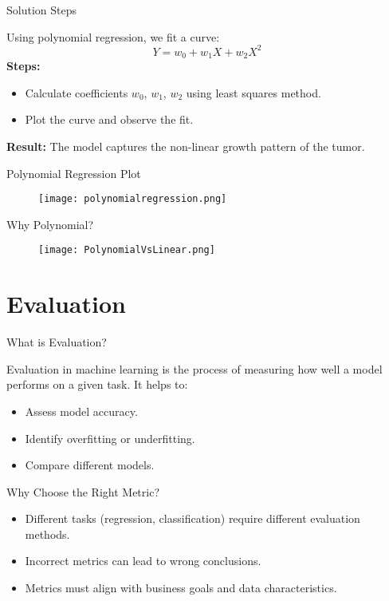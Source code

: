 \documentclass[serif, aspectratio=169]{beamer}
\begin{document}
\begin{frame}{Solution Steps}
\item Using polynomial regression, we fit a curve:
\begin{equation}
Y = w_0 + w_1 X + w_2 X^2
\end{equation}
\textbf{Steps:}
\begin{itemize}
    \item Calculate coefficients $w_0$, $w_1$, $w_2$ using least squares method.
    \item Plot the curve and observe the fit.
\end{itemize}
\textbf{Result:} The model captures the non-linear growth pattern of the tumor.
\end{frame}

\begin{frame}{Polynomial Regression Plot}
    \begin{figure}[h]
        \centering
        \texttt{[image: polynomialregression.png]} 
    \end{figure}
\end{frame}

\begin{frame}{Why Polynomial?}
    \begin{figure}[h]
        \centering
        \texttt{[image: PolynomialVsLinear.png]} 
    \end{figure}
\end{frame}

\section{Evaluation}
\begin{frame}{What is Evaluation?}
    \item Evaluation in machine learning is the process of measuring how well a model performs on a given task. It helps to:
\begin{itemize}
    \item Assess model accuracy.
    \item Identify overfitting or underfitting.
    \item Compare different models.
\end{itemize}
\end{frame}

\begin{frame}{Why Choose the Right Metric?}
    \begin{itemize}
        \item Different tasks (regression, classification) require different evaluation methods.
        \item Incorrect metrics can lead to wrong conclusions.
        \item Metrics must align with business goals and data characteristics.
    \end{itemize}
\end{frame}
\end{document}
